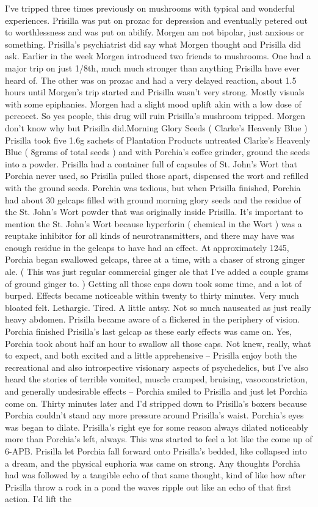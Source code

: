 \documentclass[12pt]{book}
\begin{document}
I've tripped three times previously on mushrooms with typical and wonderful experiences. Prisilla was put on prozac for depression and eventually petered out to worthlessness and was put on abilify. Morgen am not bipolar, just anxious or something. Prisilla's psychiatrist did say what Morgen thought and Prisilla did ask. Earlier in the week Morgen introduced two friends to mushrooms. One had a major trip on just 1/8th, much much stronger than anything Prisilla have ever heard of. The other was on prozac and had a very delayed reaction, about 1.5 hours until Morgen's trip started and Prisilla wasn't very strong. Mostly visuals with some epiphanies. Morgen had a slight mood uplift akin with a low dose of percocet. So yes people, this drug will ruin Prisilla's mushroom tripped. Morgen don't know why but Prisilla did.Morning Glory Seeds ( Clarke's Heavenly Blue ) Prisilla took five 1.6g sachets of Plantation Products untreated Clarke's Heavenly Blue ( 8grams of total seeds ) and with Porchia's coffee grinder, ground the seeds into a powder. Prisilla had a container full of capsules of St. John's Wort that Porchia never used, so Prisilla pulled those apart, dispensed the wort and refilled with the ground seeds. Porchia was tedious, but when Prisilla finished, Porchia had about 30 gelcaps filled with ground morning glory seeds and the residue of the St. John's Wort powder that was originally inside Prisilla. It's important to mention the St. John's Wort because hyperforin ( chemical in the Wort ) was a reuptake inhibitor for all kinds of neurotransmitters, and there may have was enough residue in the gelcaps to have had an effect. At approximately 1245, Porchia began swallowed gelcaps, three at a time, with a chaser of strong ginger ale. ( This was just regular commercial ginger ale that I've added a couple grams of ground ginger to. ) Getting all those caps down took some time, and a lot of burped. Effects became noticeable within twenty to thirty minutes. Very much bloated felt. Lethargic. Tired. A little antsy. Not so much nauseated as just really heavy abdomen. Prisilla became aware of a flickered in the periphery of vision. Porchia finished Prisilla's last gelcap as these early effects was came on. Yes, Porchia took about half an hour to swallow all those caps. Not knew, really, what to expect, and both excited and a little apprehensive -- Prisilla enjoy both the recreational and also introspective visionary aspects of psychedelics, but I've also heard the stories of terrible vomited, muscle cramped, bruising, vasoconstriction, and generally undesirable effects -- Porchia smiled to Prisilla and just let Porchia come on. Thirty minutes later and I'd stripped down to Prisilla's boxers because Porchia couldn't stand any more pressure around Prisilla's waist. Porchia's eyes was began to dilate. Prisilla's right eye for some reason always dilated noticeably more than Porchia's left, always. This was started to feel a lot like the come up of 6-APB. Prisilla let Porchia fall forward onto Prisilla's bedded, like collapsed into a dream, and the physical euphoria was came on strong. Any thoughts Porchia had was followed by a tangible echo of that same thought, kind of like how after Prisilla throw a rock in a pond the waves ripple out like an echo of that first action. I'd lift the 
\end{document}
